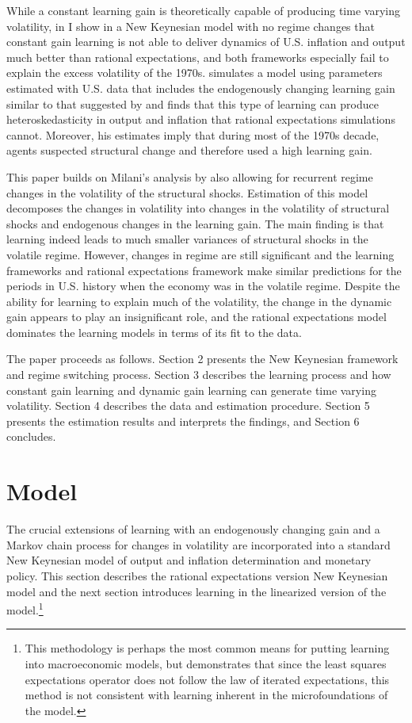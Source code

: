 While a constant learning gain is theoretically capable of producing time varying volatility, in  I show in a New Keynesian model with no regime changes that constant gain learning is not able to deliver dynamics of U.S. inflation and output much better than rational expectations, and both frameworks especially fail to explain the excess volatility of the 1970s.   simulates a model using parameters estimated with U.S. data that includes the endogenously changing learning gain similar to that suggested by  and finds that this type of learning can produce heteroskedasticity in output and inflation that rational expectations simulations cannot.  Moreover, his estimates imply that during most of the 1970s decade, agents suspected structural change and therefore used a high learning gain.  

This paper builds on Milani's analysis by also allowing for recurrent regime changes in the volatility of the structural shocks.  Estimation of this model decomposes the changes in volatility into changes in the volatility of structural shocks and endogenous changes in the learning gain.  The main finding is that learning indeed leads to much smaller variances of structural shocks in the volatile regime.  However, changes in regime are still significant and the learning frameworks and rational expectations framework make similar predictions for the periods in U.S. history when the economy was in the volatile regime.  Despite the ability for learning to explain much of the volatility, the change in the dynamic gain appears to play an insignificant role, and the rational expectations model dominates the learning models in terms of its fit to the data.

The paper proceeds as follows. Section 2 presents the New Keynesian framework and regime switching process.  Section 3 describes the learning process and how constant gain learning and dynamic gain learning can generate time varying volatility.  Section 4 describes the data and estimation procedure.  Section 5 presents the estimation results and interprets the findings, and Section 6 concludes.

\section{Model}
The crucial extensions of learning with an endogenously changing gain and a Markov chain process for changes in volatility are incorporated into a standard New Keynesian model of output and inflation determination and monetary policy.  This section describes the rational expectations version New Keynesian model and the next section introduces learning in the linearized version of the model.\footnote{This methodology is perhaps the most common means for putting learning into macroeconomic models, but  demonstrates that since the least squares expectations operator does not follow the law of iterated expectations, this method is not consistent with learning inherent in the microfoundations of the model.}

